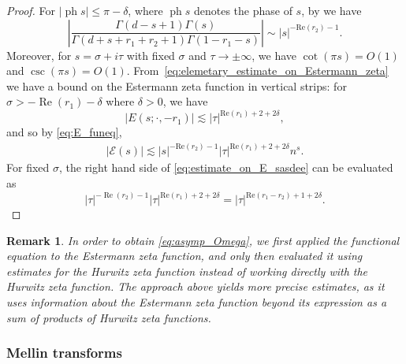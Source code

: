 \documentclass[]{article}
\newtheorem{remark}[thm]{Remark}
\renewcommand{\Re}{\operatorname{Re}}
\begin{document}
\begin{proof}
For $|\operatorname{ph} s| \le \pi - \delta $, where $\operatorname{ph} s$ denotes the phase of $s$,  by \cite[5.11.12]{NIST} we have 
\begin{equation} \left|\frac{   \Gamma(d-s+1)   \Gamma(s)  }{\Gamma(d+s+r_1+r_2+1) \Gamma(1-r_1-s)  }  \right|\sim |s|^{-\text{Re}(r_2)-1}.\end{equation}
Moreover, for $s = \sigma + i \tau$ with fixed $\sigma$ and  $\tau  \to \pm \infty$, we have 
$\cot(\pi s) = O( 1)$
and $\csc(\pi s) = O( 1)$.
From~\eqref{eq:elemetary_estimate_on_Estermann_zeta} we have a bound on the Estermann zeta function in vertical strips: 
for  $\sigma > -\Re(r_1)- \delta$ where $\delta>0$, we have 
\begin{equation}
|    E(s; \cdot  , -r_1) | \lesssim |\tau|^{\text{Re}(r_1)+2+2 \delta},
\end{equation}
and so by \eqref{eq:E_funeq}, 
\begin{align}\label{eq:estimate_on_E_sasdee}
 |\mathcal{E}(s) |\lesssim  |s|^{-\text{Re}(r_2)-1}|\tau|^{\text{Re}(r_1)+2+2 \delta}n^s.
\end{align}
For fixed $\sigma$, the right hand side of \eqref{eq:estimate_on_E_sasdee} can be evaluated as 
\begin{equation}|\tau|^{-\Re(r_2)-1}|\tau|^{\text{Re}(r_1)+2+2 \delta}    = |\tau|^{\text{Re}(r_1-r_2)+1+2\delta}.\end{equation} 
\end{proof}
\begin{remark}
In order to obtain \eqref{eq:asymp_Omega}, we first applied the functional equation to the Estermann zeta function, and only then evaluated it using estimates for the Hurwitz zeta function instead of working directly with the Hurwitz zeta function. The approach above yields more precise estimates, as it uses information about the Estermann zeta function beyond its expression as a sum of products of Hurwitz zeta functions.
\end{remark}



\subsubsection{Mellin transforms}
\end{document}
